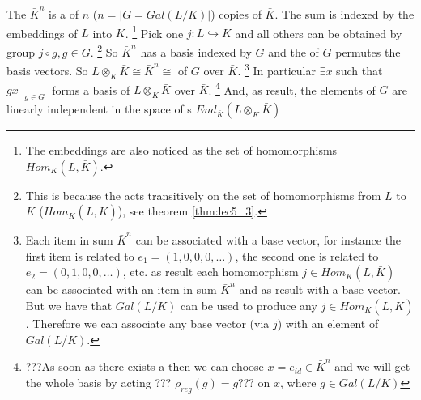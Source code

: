 The $\bar{K}^n$ is a  of $n$
($n = \left|G = Gal\left(L/K\right)\right|$)
copies of $\bar{K}$.
The sum is indexed by the embeddings of $L$ into
$\bar{K}$.
\footnote{
  The embeddings are also noticed as the set of 
  homomorphisms $Hom_K\left(L, \bar{K}\right)$.
}
Pick one $j: L \hookrightarrow \bar{K}$ and all others can
be obtained by group  $j \circ g, g \in G$.
\footnote{
  This is because the  acts transitively on
  the set of homomorphisms from $L$ to $\bar{K}$ ($Hom_K\left(L,
  \bar{K}\right)$), see theorem \ref{thm:lec5_3}. 
}
So
$\bar{K}^n$ has a basis indexed by $G$ and the  of
$G$ permutes the basis vectors. So $L \otimes_K \bar{K} \cong
\bar{K}^n \cong$  of $G$ over
$\bar{K}$.
\footnote{
  Each item in sum $\bar{K}^n$ can be associated with a base vector,
  for instance the first item is related to $e_1 = (1,0,0,0,\dots)$,
  the second one is related to $e_2 = (0,1,0,0,\dots)$, etc. as result
  each homomorphism $j \in Hom_K\left(L,\bar{K}\right)$ can be
  associated with an item in sum $\bar{K}^n$ and as result with a base
  vector. But we have that $Gal\left(L/K\right)$ can be used to
  produce any $j \in Hom_K\left(L,\bar{K}\right)$. Therefore we can
  associate any base vector (via $j$) with an element of
  $Gal\left(L/K\right)$.
}
In particular $\exists x$ such that $gx \mid_{g \in G}$
forms a basis of $L \otimes_K \bar{K}$ over $\bar{K}$.
\footnote{
  ???As soon as there exists a  then
  we can choose $x = e_{id} \in \bar{K}^n$ and we will get the whole
  basis by acting 
  ??? $\rho_{reg}\left(g\right) = g$??? on $x$, where $g \in Gal\left(L/K\right)$
} And, as result, the elements of $G$ are linearly independent in the space of
s
$End_{\bar{K}}\left(L \otimes_K \bar{K}\right)$

